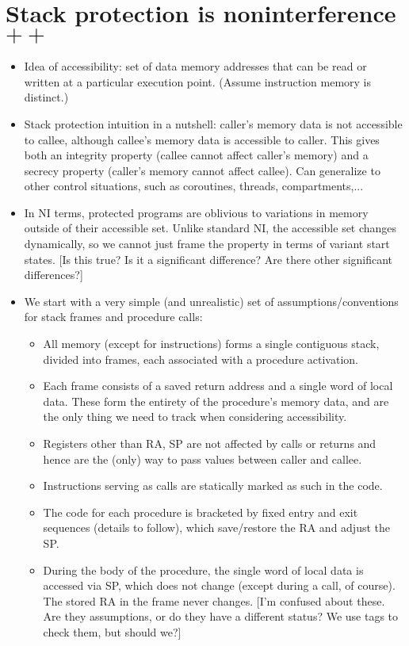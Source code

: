 \documentclass[conference]{IEEEtran}
\begin{document}
\section{Stack protection is noninterference$++$}

\begin{itemize}
\item
  Idea of accessibility: set of data memory addresses that can be read or written at a particular execution point.
  (Assume instruction memory is distinct.)
\item
  Stack protection intuition in a nutshell: caller's memory data is not accessible to callee, although callee's memory data is accessible to caller.
  This gives both an integrity property (callee cannot affect caller's memory) and a secrecy property
  (caller's memory cannot affect callee).
  Can generalize to other control situations, such as coroutines, threads, compartments,...
\item
  In NI terms, protected programs are oblivious to variations in memory outside of their accessible set.
  Unlike standard NI, the accessible set changes dynamically, so we cannot just frame the property in terms of
  variant start states. [Is this true? Is it a significant difference? Are there other significant differences?]
\item
  We start with a very simple (and unrealistic) set of assumptions/conventions for stack frames and procedure calls:
  \begin {itemize}
  \item All memory (except for instructions) forms a single contiguous stack, divided into frames, each associated with a procedure activation.
  \item Each frame consists of a saved return address and a single word of local data. These form the entirety of the procedure's memory data, and are the only thing we need to track when considering accessibility.
  \item Registers other than RA, SP are not affected by calls or returns and hence are the (only) way to pass values between caller and callee.
  \item Instructions serving as calls are statically marked as such in the code.
  \item The code for each procedure is bracketed by fixed entry and exit sequences (details to follow), which save/restore the RA and
    adjust the SP.
  \item During the body of the procedure, the single word of local data is accessed via SP, which does not change (except during a call, of course).  The stored RA in the frame never changes. [I'm confused about these. Are they assumptions, or do they have a different status?  We use tags to check them, but should we?]

\end{itemize}
\end{itemize}
\end{document}
